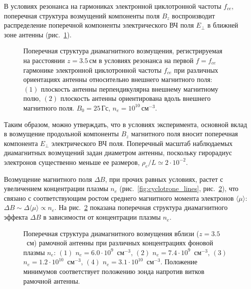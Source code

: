 \documentclass[10pt]{disser}
\begin{document}
В условиях резонанса на гармониках электронной циклотронной частоты $f_{ce}$, поперечная структура возмущений компоненты поля $B_{z}$  воспроизводит распределение поперечной компоненты электрического ВЧ поля $E_{\perp}$ в ближней зоне антенны (\mbox{рис.~\ref{fig:tr+par_distr}}).
\begin{figure}[H]
    \centering
    \def\svgwidth{0.6\columnwidth} %
    
    \caption{Поперечная структура диамагнитного возмущения, регистрируемая на расстоянии $z=3.5$\,см в условиях резонанса на первой $f=f_{ce}$ гармонике электронной циклотронной частоты $f_{ce}$ при различных ориентациях антенны относительно внешнего магнитного поля: $(1)$ плоскость антенны перпендикулярна внешнему магнитному полю, $(2)$ плоскость антенны ориентирована вдоль внешнего магнитного поля. $B_{0}=25$\,Гс, $n_{e}=10^{10}$\,см$^{-3}$.}
    \label{fig:tr+par_distr}
\end{figure}

Таким образом, можно утверждать, что в условиях эксперимента, основной вклад в возмущение продольной компоненты  $B_{z}$ магнитного поля вносит поперечная компонента $E_{\perp}$ электрического ВЧ поля. Поперечный масштаб наблюдаемых диамагнитных возмущений задан диаметром антенны, поскольку гирорадиус электронов существенно меньше ее размеров, $\rho_e/L \simeq2\cdot 10^{-2}$. 

Возмущение магнитного поля $\Delta{}B$, при прочих равных условиях, растет с увеличением концентрации плазмы $n_{e}$ (\mbox{рис.~\ref{fig:cyclotrone_lines}}, \mbox{рис.~\ref{fig:ne_distr}}), что связано с соответствующим ростом среднего магнитного момента электронов $\langle{}\mu{}\rangle$: $\Delta{}B\sim{}\Delta{}\langle{}\mu{}\rangle{}\propto{}n_{e}$.
На \mbox{рис.~\ref{fig:ne_distr}} показана поперечная структура диамагнитного эффекта $\Delta{}B$ в зависимости от концентрации плазмы $n_{e}$. 
\begin{figure}[H]
   \centering
   \def\svgwidth{0.5\columnwidth} %
   
   \vspace{0.5cm}
   \caption{Поперечная структура диамагнитного возмущения вблизи ($z=3.5$~см) рамочной антенны при различных концентрациях фоновой плазмы $n_{e}$: $(1)$ $n_{e}=6.0\cdot{}10^{9}$~см$^{-3}$, $(2)$ $n_{e}=7.4\cdot{}10^{9}$~см$^{-3}$, $(3)$  $n_{e}=1.2\cdot{}10^{10}$~см$^{-3}$, $(4)$ $n_{e}=3.1\cdot{}10^{10}$~см$^{-3}$. Положение минимумов соответствует положению зонда напротив витков рамочной антенны.}
   \label{fig:ne_distr}
\end{figure}
\end{document}
